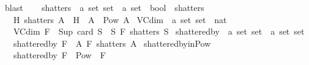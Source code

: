 \begin{isabellebody}
\ blast\isanewline
\ \ \isamarkupfalse%
\isanewline
{}\isamarkupfalse%
%
\endisatagproof
{\isafoldproof}%
%
\isadelimproof
%
\endisadelimproof
%
\isadelimdocument
%
\endisadelimdocument
%
\isatagdocument
%
\isamarkuptrue%
%
\endisatagdocument
{\isafolddocument}%
%
\isadelimdocument
%
\endisadelimdocument
{}\isamarkupfalse%
\ shatters\ {\isacharcolon}{\kern0pt}{\isacharcolon}{\kern0pt}\ {\isachardoublequoteopen}{\isacharprime}{\kern0pt}a\ set\ set\ {\isasymRightarrow}\ {\isacharprime}{\kern0pt}a\ set\ {\isasymRightarrow}\ bool{\isachardoublequoteclose}\ {\isacharparenleft}{\kern0pt}\ {\isachardoublequoteopen}shatters{\isachardoublequoteclose}\ {}{}{\isacharparenright}{\kern0pt}\isanewline
\ \ \ {\isachardoublequoteopen}H\ shatters\ A\ {\isasymequiv}\ H\ {\isasyminter}{\isacharasterisk}{\kern0pt}\ A\ {\isacharequal}{\kern0pt}\ Pow\ A{\isachardoublequoteclose}\isanewline
\isanewline
{}\isamarkupfalse%
\ VC{\isacharunderscore}{\kern0pt}dim\ {\isacharcolon}{\kern0pt}{\isacharcolon}{\kern0pt}\ {\isachardoublequoteopen}{\isacharprime}{\kern0pt}a\ set\ set\ {\isasymRightarrow}\ nat{\isachardoublequoteclose}\isanewline
\ \ \ {\isachardoublequoteopen}VC{\isacharunderscore}{\kern0pt}dim\ F\ {\isacharequal}{\kern0pt}\ Sup\ {\isacharbraceleft}{\kern0pt}card\ S\ {\isacharbar}{\kern0pt}\ S{\isachardot}{\kern0pt}\ F\ shatters\ S{\isacharbraceright}{\kern0pt}{\isachardoublequoteclose}\isanewline
\isanewline
{}\isamarkupfalse%
\ shattered{\isacharunderscore}{\kern0pt}by\ {\isacharcolon}{\kern0pt}{\isacharcolon}{\kern0pt}\ {\isachardoublequoteopen}{\isacharprime}{\kern0pt}a\ set\ set\ {\isasymRightarrow}\ {\isacharprime}{\kern0pt}a\ set\ set{\isachardoublequoteclose}\isanewline
\ \ \ {\isachardoublequoteopen}shattered{\isacharunderscore}{\kern0pt}by\ F\ {\isasymequiv}\ {\isacharbraceleft}{\kern0pt}A{\isachardot}{\kern0pt}\ F\ shatters\ A{\isacharbraceright}{\kern0pt}{\isachardoublequoteclose}\isanewline
\isanewline
{}\isamarkupfalse%
\ shattered{\isacharunderscore}{\kern0pt}by{\isacharunderscore}{\kern0pt}in{\isacharunderscore}{\kern0pt}Pow{\isacharcolon}{\kern0pt}\isanewline
\ \ \ {\isachardoublequoteopen}shattered{\isacharunderscore}{\kern0pt}by\ F\ {\isasymsubseteq}\ Pow\ {\isacharparenleft}{\kern0pt}{\isasymUnion}\ F{\isacharparenright}{\kern0pt}{\isachardoublequoteclose}\isanewline

\end{isabellebody}
